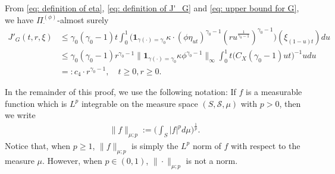 \documentclass[12pt,a4paper]{amsart}
\theoremstyle{definition}
\numberwithin{equation}{section}
\begin{document}
From \eqref{eq: definition of eta}, \eqref{eq: definition of J'_G} and \eqref{eq: upper bound for G}, we have $\Pi^{(\phi)}_\cdot$-almost surely
\begin{align}\label{eq: upper bound for J'_G}
	J'_G(t,r,\xi)
	& \leq \gamma_0 (\gamma_0 - 1) t \int_0^1 \big( \mathbf 1_{\gamma(\cdot) = \gamma_0} \kappa \cdot (\phi \eta_{ut})^{\gamma_0 - 1} (ru^{\frac{1}{\gamma_0 - 1}})^{\gamma_0 - 1}\big) (\xi_{(1-u)t}) du
	\\ &\leq \gamma_0(\gamma_0 - 1) r^{\gamma_0 - 1} \big\|   \mathbf 1_{\gamma(\cdot) = \gamma_0}  \kappa \phi^{\gamma_0 - 1} \big\|_\infty \int_0^1 t \big(  C_X(\gamma_0 - 1) ut \big)^{- 1}  u  du
	\\ &=: c_4 \cdot r^{\gamma_0 - 1},
       \quad t\geq 0, r\geq 0.
\end{align}

In the remainder of this proof, we use the following notation:
If $f$ is a measurable function which is $L^p$ integrable on the measure space $(S,\mathscr S,\mu)$ with $p > 0$, then we write
\begin{align}
	\|f\|_{\mu;p}
	:= \Big(\int_{S} |f|^p d\mu \Big)^{\frac{1}{p}}.
\end{align}
Notice that, when $p\geq 1$, $\|f\|_{\mu;p}$ is simply the $L^p$ norm of $f$ with respect to the measure $\mu$.	
However, when $p \in (0,1)$, $\|\cdot\|_{\mu; p}$ is not a norm.
\end{document}
